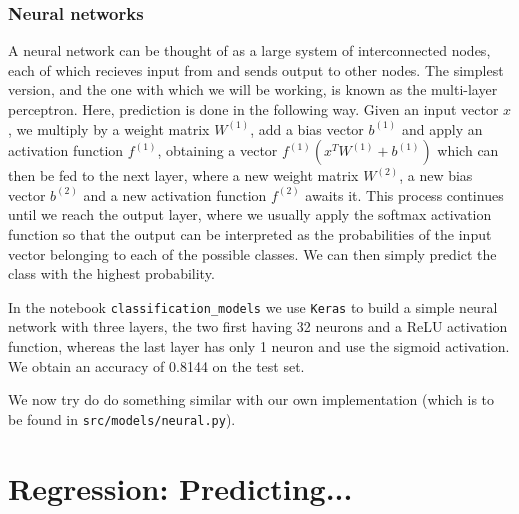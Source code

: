 \documentclass{article}
\begin{document}
\subsubsection{Neural networks}
A neural network can be thought of as a large system of interconnected nodes, each of which recieves input from and sends output to other nodes. The simplest version, and the one with which we will be working, is known as the multi-layer perceptron. Here, prediction is done in the following way. Given an input vector $x$, we multiply by a weight matrix $W^{(1)}$, add a bias vector $b^{(1)}$ and apply an activation function $f^{(1)}$, obtaining a vector $f^{(1)}(x^T W^{(1)} + b^{(1)})$ which can then be fed to the next layer, where a new weight matrix $W^{(2)}$, a new bias vector $b^{(2)}$ and a new activation function $f^{(2)}$ awaits it. This process continues until we reach the output layer, where we usually apply the softmax activation function so that the output can be interpreted as the probabilities of the input vector belonging to each of the possible classes. We can then simply predict the class with the highest probability.

In the notebook \texttt{classification\_models} we use \texttt{Keras} to build a simple neural network with three layers, the two first having 32 neurons and a ReLU activation function, whereas the last layer has only 1 neuron and use the sigmoid activation. We obtain an accuracy of 0.8144 on the test set.

We now try do do something similar with our own implementation (which is to be found in \texttt{src/models/neural.py}).

\section{Regression: Predicting...}
\end{document}
